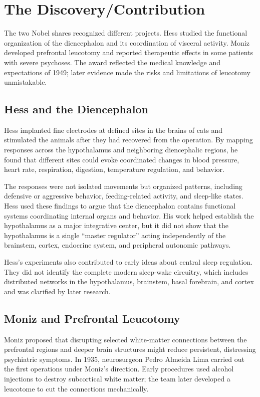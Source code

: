 \section{The Discovery/Contribution}

The two Nobel shares recognized different projects. Hess studied the functional organization of the diencephalon and its coordination of visceral activity. Moniz developed prefrontal leucotomy and reported therapeutic effects in some patients with severe psychoses. The award reflected the medical knowledge and expectations of 1949; later evidence made the risks and limitations of leucotomy unmistakable.

\subsection{Hess and the Diencephalon}

Hess implanted fine electrodes at defined sites in the brains of cats and stimulated the animals after they had recovered from the operation. By mapping responses across the hypothalamus and neighboring diencephalic regions, he found that different sites could evoke coordinated changes in blood pressure, heart rate, respiration, digestion, temperature regulation, and behavior.

The responses were not isolated movements but organized patterns, including defensive or aggressive behavior, feeding-related activity, and sleep-like states. Hess used these findings to argue that the diencephalon contains functional systems coordinating internal organs and behavior. His work helped establish the hypothalamus as a major integrative center, but it did not show that the hypothalamus is a single ``master regulator'' acting independently of the brainstem, cortex, endocrine system, and peripheral autonomic pathways.

Hess's experiments also contributed to early ideas about central sleep regulation. They did not identify the complete modern sleep-wake circuitry, which includes distributed networks in the hypothalamus, brainstem, basal forebrain, and cortex and was clarified by later research.

\subsection{Moniz and Prefrontal Leucotomy}

Moniz proposed that disrupting selected white-matter connections between the prefrontal regions and deeper brain structures might reduce persistent, distressing psychiatric symptoms. In 1935, neurosurgeon Pedro Almeida Lima carried out the first operations under Moniz's direction. Early procedures used alcohol injections to destroy subcortical white matter; the team later developed a leucotome to cut the connections mechanically.

